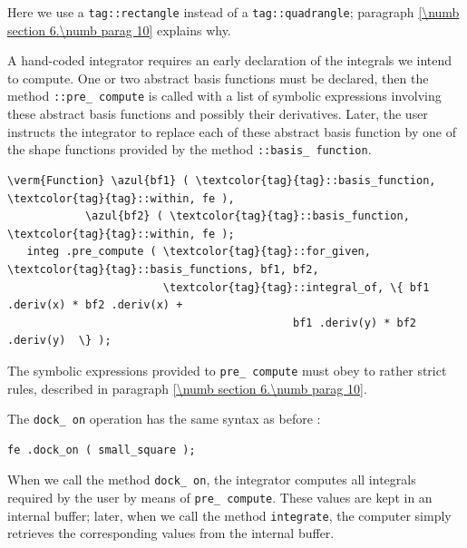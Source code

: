 Here we use a {\small\tt\textcolor{tag}{tag}::rectangle} instead of
a {\small\tt\textcolor{tag}{tag}::quadrangle};
paragraph \ref{\numb section 6.\numb parag 10} explains why.

A hand-coded integrator requires an early declaration of the integrals we intend to compute.
One or two abstract basis functions must be declared, then the method
{\small\tt{}::pre\_\,compute} is called
with a list of symbolic expressions
involving these abstract basis functions and possibly their derivatives.
Later, the user instructs the integrator to replace each of these abstract basis function
by one of the shape functions provided by the method
{\small\tt{}::basis\_\,function}.

\begin{Verbatim}[commandchars=\\\{\},formatcom=\small\tt,frame=single,
   label=parag-\ref{\numb section 6.\numb parag 9}.cpp,rulecolor=\color{moldura},
   baselinestretch=0.94,framesep=2mm                                            ]
   \verm{Function} \azul{bf1} ( \textcolor{tag}{tag}::basis_function, \textcolor{tag}{tag}::within, fe ),
            \azul{bf2} ( \textcolor{tag}{tag}::basis_function, \textcolor{tag}{tag}::within, fe );
   integ .pre_compute ( \textcolor{tag}{tag}::for_given, \textcolor{tag}{tag}::basis_functions, bf1, bf2,
                        \textcolor{tag}{tag}::integral_of, \{ bf1 .deriv(x) * bf2 .deriv(x) +
                                            bf1 .deriv(y) * bf2 .deriv(y)  \} );
\end{Verbatim}

The symbolic expressions provided to {\small\tt pre\_\,compute} must obey to rather strict
rules, described in paragraph \ref{\numb section 6.\numb parag 10}.

The {\small\tt dock\_\,on} operation has the same syntax as before :

\begin{Verbatim}[commandchars=\\\{\},formatcom=\small\tt,frame=single,
   label=parag-\ref{\numb section 6.\numb parag 9}.cpp,rulecolor=\color{moldura},
   baselinestretch=0.94,framesep=2mm                                            ]
      fe .dock_on ( small_square );
\end{Verbatim}

When we call the method {\small\tt dock\_\,on}, the integrator computes all integrals
required by the user by means of {\small\tt pre\_\,compute}.
These values are kept in an internal buffer; later, when we call the method
{\small\tt integrate}, the computer simply retrieves the corresponding values from
the internal buffer.

